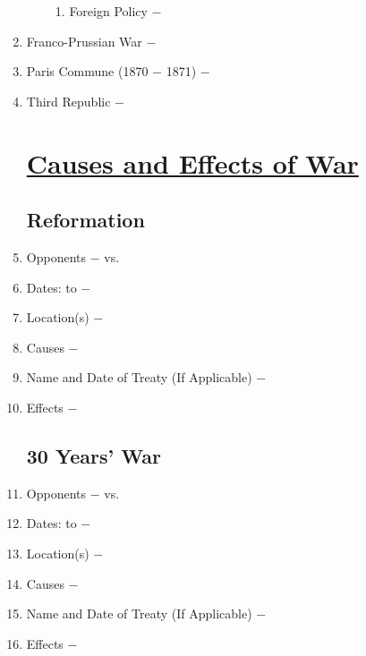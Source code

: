 \documentclass[12pt]{article}
\begin{document}
\begin{enumerate}
\begin{enumerate}[label=\arabic{*}.]
\begin{enumerate}[label=\arabic{*}.]
\item Foreign Policy $-$

\end{enumerate}
\end{enumerate}
\setcounter{enumi}{545}


\item Franco-Prussian War $-$

\item Paris Commune (1870 $-$ 1871) $-$ 

\item Third Republic $-$


\section{\underline{Causes and Effects of War}}

\subsection{Reformation} 

\item Opponents $-$ vs.

\item Dates: to $-$

\item Location(s) $-$ 

\item Causes $-$

\item Name and Date of Treaty (If Applicable) $-$ 

\item Effects $-$ 

\subsection{30 Years' War}

\item Opponents $-$ vs.

\item Dates: to $-$

\item Location(s) $-$ 

\item Causes $-$

\item Name and Date of Treaty (If Applicable) $-$ 

\item Effects $-$


\end{enumerate}
\end{document}
